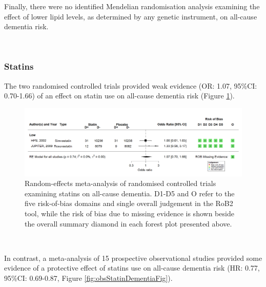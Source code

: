 \documentclass[a4paper, twoside]{templates/ociamthesis}
\begin{document}
Finally, there were no identified Mendelian randomisation analysis examining the effect of lower lipid levels, as determined by any genetic instrument, on all-cause dementia risk.

~

\hypertarget{statins}{%
\subsubsection{Statins}\label{statins}}

The two randomised controlled trials provided weak evidence (OR: 1.07, 95\%CI: 0.70-1.66) of an effect on statin use on all-cause dementia risk (Figure \ref{fig:rctStatinDementiaFig}).





\begin{figure}[H]
\includegraphics[width=1\linewidth]{figures/sys-rev/fp_rct_statins_Dementia} \caption[Random-effects meta-analysis of statins on all-cause dementia]{Random-effects meta-analysis of randomised controlled trials examining statins on all-cause dementia. D1-D5 and O refer to the five risk-of-bias domains and single overall judgement in the RoB2 tool, while the risk of bias due to missing evidence is shown beside the overall summary diamond in each forest plot presented above.}\label{fig:rctStatinDementiaFig}
\end{figure}

~

In contrast, a meta-analysis of 15 prospective observational studies provided some evidence of a protective effect of statins use on all-cause dementia risk (HR: 0.77, 95\%CI: 0.69-0.87, Figure \ref{fig:obsStatinDementiaFig}).
\end{document}
